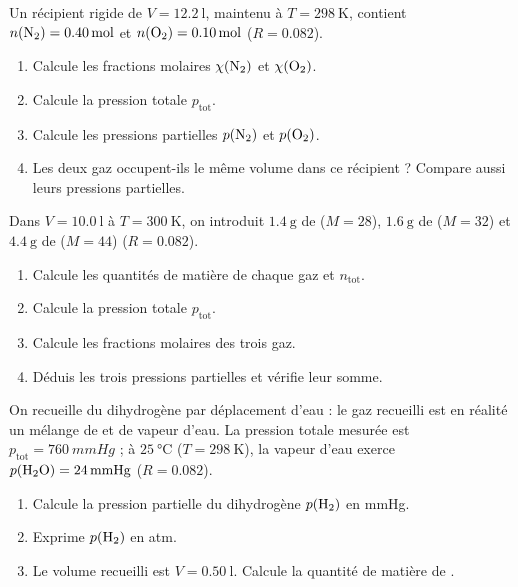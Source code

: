 \documentclass[11pt,a4paper]{article}
\begin{document}
\begin{exo}
Un récipient rigide de $V=\qty{12.2}{\litre}$, maintenu à $T=\qty{298}{\kelvin}$, contient
$n(\ce{N2})=\qty{0.40}{\mole}$ et $n(\ce{O2})=\qty{0.10}{\mole}$ ($R=\num{0,082}$).
\begin{enumerate}[label=\alph*)]
  \item Calcule les fractions molaires $\chi(\ce{N2})$ et $\chi(\ce{O2})$.
  \item Calcule la pression totale $p_{\text{tot}}$.
  \item Calcule les pressions partielles $p(\ce{N2})$ et $p(\ce{O2})$.
  \item Les deux gaz occupent-ils le même volume dans ce récipient ? Compare aussi leurs pressions
        partielles.
\end{enumerate}
\end{exo}

\begin{exo}
Dans $V=\qty{10.0}{\litre}$ à $T=\qty{300}{\kelvin}$, on introduit $\qty{1.4}{\gram}$ de 
($M=28$), $\qty{1.6}{\gram}$ de  ($M=32$) et $\qty{4.4}{\gram}$ de  ($M=44$)
($R=\num{0,082}$).
\begin{enumerate}[label=\alph*)]
  \item Calcule les quantités de matière de chaque gaz et $n_{\text{tot}}$.
  \item Calcule la pression totale $p_{\text{tot}}$.
  \item Calcule les fractions molaires des trois gaz.
  \item Déduis les trois pressions partielles et vérifie leur somme.
\end{enumerate}
\end{exo}

\begin{exo}
On recueille du dihydrogène  par déplacement d'eau : le gaz recueilli est en réalité un mélange
de  et de vapeur d'eau. La pression totale mesurée est $p_{\text{tot}}=\qty{760}{mmHg}$ ; à
$\qty{25}{\degreeCelsius}$ ($T=\qty{298}{\kelvin}$), la vapeur d'eau exerce $p(\ce{H2O})=\qty{24}{mmHg}$
($R=\num{0,082}$).
\begin{enumerate}[label=\alph*)]
  \item Calcule la pression partielle du dihydrogène $p(\ce{H2})$ en \si{mmHg}.
  \item Exprime $p(\ce{H2})$ en \si{atm}.
  \item Le volume recueilli est $V=\qty{0.50}{\litre}$. Calcule la quantité de matière de .
\end{enumerate}
\end{exo}
\end{document}
